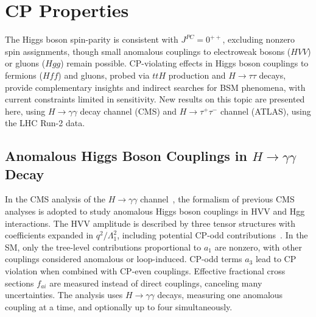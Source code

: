 \documentclass[a4paper,11pt]{article}
\begin{document}
\section{CP Properties}

The Higgs boson spin-parity is consistent with $J^{PC}=0^{++}$,
excluding nonzero spin assignments, though small anomalous couplings
to electroweak bosons ($HVV$) or gluons ($Hgg$) remain possible.
CP-violating effects in Higgs boson couplings to fermions ($Hff$) and
gluons, probed via $ttH$ production and $H \to \tau\tau$ decays,
provide complementary insights and indirect searches for BSM
phenomena, with current constraints limited in sensitivity.  New
results on this topic are presented here, using $H\to\gamma\gamma$ decay
channel (CMS) and $H\to\tau^+\tau^-$ channel (ATLAS), using the LHC
Run-2 data.

\subsection{Anomalous Higgs Boson Couplings in $H\to\gamma\gamma$ Decay}

In the CMS analysis of the $H \to \gamma\gamma$
channel~\cite{hggac-cms}, the formalism of previous CMS analyses is
adopted to study anomalous Higgs boson couplings in HVV and Hgg
interactions.  The HVV amplitude is described by three tensor
structures with coefficients expanded in $q^2/\Lambda^2_1$, including
potential CP-odd contributions~\cite{Gao:2010qx}. In the SM, only the
tree-level contributions proportional to $a_1$ are nonzero, with other
couplings considered anomalous or loop-induced.  CP-odd terms $a_3$
lead to CP violation when combined with CP-even couplings.  Effective
fractional cross sections $f_{ai}$ are measured instead of direct
couplings, canceling many uncertainties. The analysis uses $H \to
\gamma\gamma$ decays, measuring one anomalous coupling at a time, and
optionally up to four simultaneously.
\end{document}
